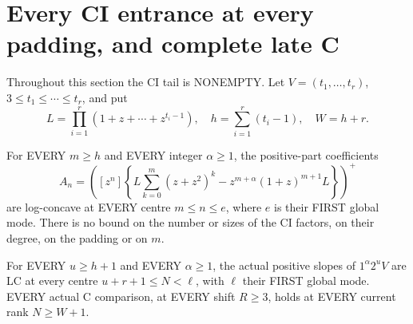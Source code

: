 \section{Every CI entrance at every padding, and complete late C}
Throughout this section the CI tail is NONEMPTY. Let
$V=(t_1,\ldots,t_r)$, $3\le t_1\le\cdots\le t_r$, and put
\[
 L=\prod_{i=1}^r(1+z+\cdots+z^{t_i-1}),\quad
 h=\sum_{i=1}^r(t_i-1),\quad W=h+r.
\]

\begin{theorem}
For EVERY $m\ge h$ and EVERY integer $\alpha\ge1$, the positive-part
coefficients
\[
 A_n=\left([z^n]\left\{
 L\sum_{k=0}^m(z+z^2)^k-z^{m+\alpha}(1+z)^{m+1}L
 \right\}\right)^+
\]
are log-concave at EVERY centre $m\le n\le e$, where $e$ is their
FIRST global mode. There is no bound on the number or sizes of the
CI factors, on their degree, on the padding or on $m$.
\end{theorem}

\begin{theorem}
For EVERY $u\ge h+1$ and EVERY $\alpha\ge1$, the actual positive
slopes of $1^\alpha2^uV$ are LC at every centre
$u+r+1\le N<\ell$, with $\ell$ their FIRST global mode.
EVERY actual C comparison, at EVERY shift $R\ge3$, holds at EVERY
current rank $N\ge W+1$.
\end{theorem}


